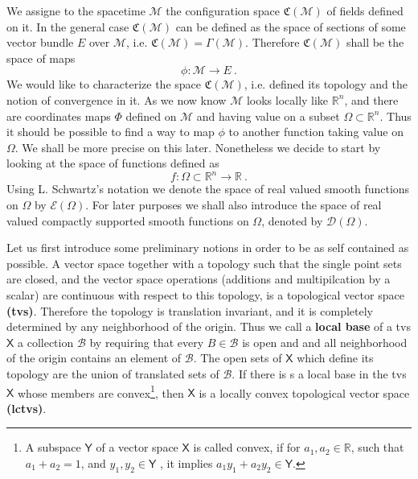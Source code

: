 \documentclass[10pt]{book}
\newcommand{\Bcal}{\mathcal{B}}
\newcommand{\Dcal}{\mathcal{D}}
\newcommand{\Ecal}{\mathcal{E}}
\newcommand{\Mcal}{\mathcal{M}}
\newcommand{\Rbb}{\mathbb{R}}
\newcommand{\Crak}{\mathfrak{C}}
\newcommand{\Xsf}{\mathsf{X}}
\newcommand{\Ysf}{\mathsf{Y}}
\theoremstyle{break}
\begin{document}
We assigne to the spacetime $\Mcal$ the configuration space $\Crak(\Mcal)$ of fields defined on it. In the general case $\Crak(\Mcal)$ can be defined as the space of sections of some vector bundle $E$ over $\Mcal$, i.e. $\Crak(\Mcal) = \Gamma(\Mcal)$. Therefore $\Crak(\Mcal)$ shall be the space of maps 
%
\begin{equation*}
\phi : \Mcal \to E \ . 
\end{equation*}
%
We would like to characterize the space $\Crak(\Mcal)$, i.e. defined its topology and the notion of convergence in it. As we now know $\Mcal$ looks locally like $\Rbb^n$, and there are coordinates maps $\Phi$ defined on $\Mcal$ and having value on a subset $\Omega \subset \Rbb^n$. Thus it should be possible to find a way to map $\phi$ to another function taking value on $\Omega$. We shall be more precise on this later. Nonetheless we decide to start by looking at the space of functions defined as 
%
\begin{equation*}
f : \Omega \subset \Rbb^n \to \Rbb \ . 
\end{equation*}
%
Using L. Schwartz's notation we denote the space of real valued smooth functions on $\Omega$ by $\Ecal(\Omega)$\index{$\Ecal(\Omega)$}. For later purposes we shall also introduce the space of real valued compactly supported smooth functions on $\Omega$, denoted by $\Dcal(\Omega)$\index{$\Dcal(\Omega)$}.


\bigskip


Let us first introduce some preliminary notions in order to be as self contained as possible. A vector space together with a topology such that the single point sets are closed, and the vector space operations (additions and multipilcation by a scalar) are continuous with respect to this topology, is a topological vector space \textbf{(tvs)}. Therefore the topology is translation invariant, and it is completely determined by any neighborhood of the origin. Thus we call a \textbf{local base} of a tvs $\Xsf$ a collection $\Bcal$ by requiring that every $B\in\Bcal$ is open and and all neighborhood of the origin contains an element of $\Bcal$. The open sets of $\Xsf$ which define its topology are the union of translated sets of $\Bcal$. If there is s a local base in the tvs $\Xsf$ whose members are convex\footnote{A subspace $\Ysf$ of a vector space $\Xsf$ is called convex, if for $a_1, a_2 \in \Rbb$, such that $a_1 + a_2 = 1$, and $y_1, y_2 \in \Ysf$ , it implies $a_1 y_1 + a_2 y_2 \in \Ysf$.}, then $\Xsf$ is a locally convex topological vector space \textbf{(lctvs)}.
\end{document}
